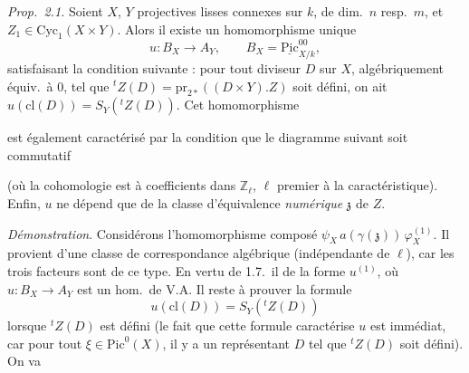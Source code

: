 \documentclass[11pt,a4paper]{article}
\begin{document}
\emph{Prop.\ 2.1.} Soient $X$, $Y$ projectives lisses connexes sur $k$, de dim.\ $n$ resp.\ $m$, et  $Z_1 \in \mathrm{Cyc}_1(X \times Y)$. Alors il existe un homomorphisme unique
\[
  u : B_X \longrightarrow A_Y , \qquad B_X = \underline{\mathrm{Pic}}^{00}_{X/k} ,
\]
satisfaisant la condition suivante : pour tout diviseur $D$ sur $X$, algébriquement équiv.\ à $0$, tel que ${}^{t}Z(D) = \mathrm{pr}_{2*}((D \times Y) . Z)$ soit défini, on ait $u(\mathrm{cl}(D)) = S_Y({}^{t}Z(D))$. Cet homomorphisme

est également caractérisé par la condition que le diagramme suivant soit commutatif



(où la cohomologie est à coefficients dans $\mathbb{Z}_{\ell}$, $\ell$ premier à la caractéristique). Enfin, $u$ ne dépend que de la classe d'équivalence \emph{numérique} $\mathfrak{z}$ de $Z$.

\emph{Démonstration}. Considérons l'homomorphisme composé $\psi_X \, a(\gamma(\mathfrak{z})) \, \varphi_X^{(1)}$. Il provient d'une classe de  correspondance algébrique (indépendante de $\ell$), car les trois facteurs sont de ce type. En vertu de 1.7.\ il  de la forme $u^{(1)}$, où $u : B_X \to A_Y$ est un hom.\ de V.A. Il reste à prouver la formule
\[
  u(\mathrm{cl}(D)) = S_Y({}^{t}Z(D))
\]
lorsque ${}^{t}Z(D)$ est défini (le fait que cette formule caractérise $u$ est immédiat, car pour tout $\xi \in \mathrm{Pic}^{0}(X)$, il y a un représentant $D$ tel que ${}^{t}Z(D)$ soit défini). On va
\end{document}
